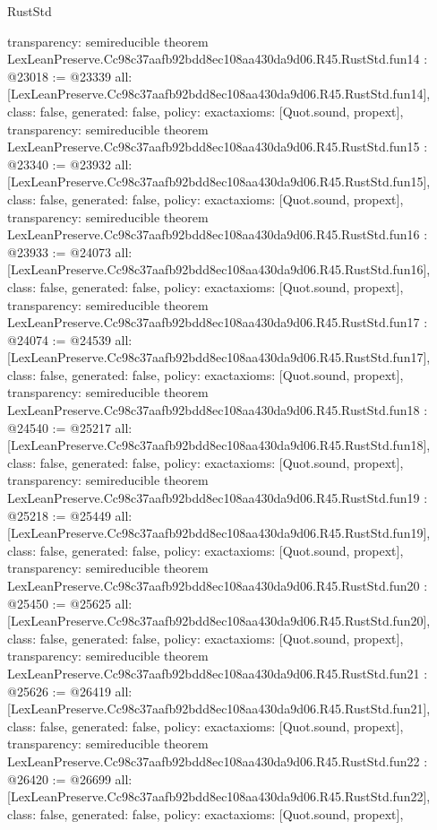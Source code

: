 \begin{lexlean}{RustStd}
\begin{coremodule}
{  transparency: semireducible
}
theorem LexLeanPreserve.Cc98c37aafb92bdd8ec108aa430da9d06.R45.RustStd.fun14 : @23018 := @23339 {
  all: [LexLeanPreserve.Cc98c37aafb92bdd8ec108aa430da9d06.R45.RustStd.fun14],
  class: false,
  generated: false,
  policy: exact{axioms: [Quot.sound, propext]},
  transparency: semireducible
}
theorem LexLeanPreserve.Cc98c37aafb92bdd8ec108aa430da9d06.R45.RustStd.fun15 : @23340 := @23932 {
  all: [LexLeanPreserve.Cc98c37aafb92bdd8ec108aa430da9d06.R45.RustStd.fun15],
  class: false,
  generated: false,
  policy: exact{axioms: [Quot.sound, propext]},
  transparency: semireducible
}
theorem LexLeanPreserve.Cc98c37aafb92bdd8ec108aa430da9d06.R45.RustStd.fun16 : @23933 := @24073 {
  all: [LexLeanPreserve.Cc98c37aafb92bdd8ec108aa430da9d06.R45.RustStd.fun16],
  class: false,
  generated: false,
  policy: exact{axioms: [Quot.sound, propext]},
  transparency: semireducible
}
theorem LexLeanPreserve.Cc98c37aafb92bdd8ec108aa430da9d06.R45.RustStd.fun17 : @24074 := @24539 {
  all: [LexLeanPreserve.Cc98c37aafb92bdd8ec108aa430da9d06.R45.RustStd.fun17],
  class: false,
  generated: false,
  policy: exact{axioms: [Quot.sound, propext]},
  transparency: semireducible
}
theorem LexLeanPreserve.Cc98c37aafb92bdd8ec108aa430da9d06.R45.RustStd.fun18 : @24540 := @25217 {
  all: [LexLeanPreserve.Cc98c37aafb92bdd8ec108aa430da9d06.R45.RustStd.fun18],
  class: false,
  generated: false,
  policy: exact{axioms: [Quot.sound, propext]},
  transparency: semireducible
}
theorem LexLeanPreserve.Cc98c37aafb92bdd8ec108aa430da9d06.R45.RustStd.fun19 : @25218 := @25449 {
  all: [LexLeanPreserve.Cc98c37aafb92bdd8ec108aa430da9d06.R45.RustStd.fun19],
  class: false,
  generated: false,
  policy: exact{axioms: [Quot.sound, propext]},
  transparency: semireducible
}
theorem LexLeanPreserve.Cc98c37aafb92bdd8ec108aa430da9d06.R45.RustStd.fun20 : @25450 := @25625 {
  all: [LexLeanPreserve.Cc98c37aafb92bdd8ec108aa430da9d06.R45.RustStd.fun20],
  class: false,
  generated: false,
  policy: exact{axioms: [Quot.sound, propext]},
  transparency: semireducible
}
theorem LexLeanPreserve.Cc98c37aafb92bdd8ec108aa430da9d06.R45.RustStd.fun21 : @25626 := @26419 {
  all: [LexLeanPreserve.Cc98c37aafb92bdd8ec108aa430da9d06.R45.RustStd.fun21],
  class: false,
  generated: false,
  policy: exact{axioms: [Quot.sound, propext]},
  transparency: semireducible
}
theorem LexLeanPreserve.Cc98c37aafb92bdd8ec108aa430da9d06.R45.RustStd.fun22 : @26420 := @26699 {
  all: [LexLeanPreserve.Cc98c37aafb92bdd8ec108aa430da9d06.R45.RustStd.fun22],
  class: false,
  generated: false,
  policy: exact{axioms: [Quot.sound, propext]},
}
\end{coremodule}
\end{lexlean}
